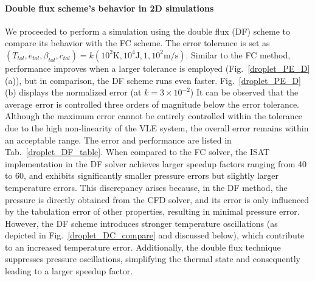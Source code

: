\paragraph{Double flux scheme's behavior in 2D simulations}
\label{sec:DF}
We proceeded to perform a simulation using the double flux (DF) scheme to compare its behavior with the FC scheme. The error tolerance is set as $(T_{tol},e_{tol},\beta_{tol},c_{tol})= k (10^2 \text{K}, 10^4 \text{J}, 1, 10^2\text{m/s})$. Similar to the FC method,  performance improves when a larger tolerance is employed (Fig.~\ref{droplet_PE_D}(a)), but in comparison, the DF scheme runs even faster. Fig.~\ref{droplet_PE_D}(b) displays the normalized error (at $k=3 \times 10^{-2}$) It can be observed that the average error is controlled three orders of magnitude below the error tolerance. Although the maximum error cannot be entirely controlled within the tolerance due to the high non-linearity of the VLE system, the overall error remains within an acceptable range. The error and performance are listed in Tab.~\ref{droplet_DF_table}. When compared to the FC solver, the ISAT implementation in the DF solver achieves larger speedup factors ranging from 40 to 60, and exhibits significantly smaller pressure errors but slightly larger temperature errors. This discrepancy arises because, in the DF method, the pressure is directly obtained from the CFD solver, and its error is only influenced by the tabulation error of other properties, resulting in minimal pressure error. However, the DF scheme introduces stronger temperature oscillations (as depicted in Fig.~\ref{droplet_DC_compare} and discussed below), which contribute to an increased temperature error. Additionally, the double flux technique suppresses pressure oscillations, simplifying the thermal state and consequently leading to a larger speedup factor.



